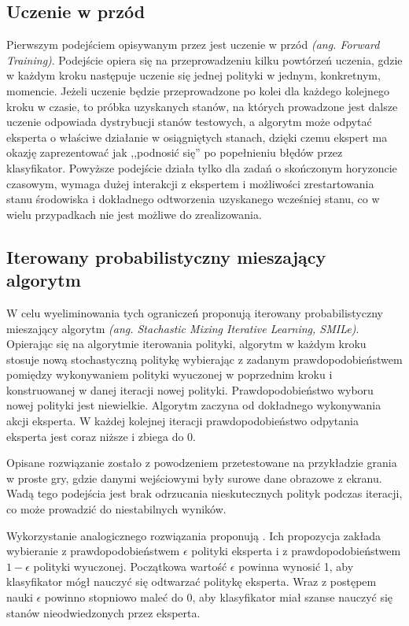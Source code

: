 \subsection{Uczenie w przód}
Pierwszym podejściem opisywanym przez \cite{bagnell2010efficient} jest uczenie w przód \textit{(ang. Forward Training)}. Podejście opiera się na przeprowadzeniu kilku powtórzeń uczenia, gdzie w każdym kroku następuje uczenie się jednej polityki w jednym, konkretnym, momencie. Jeżeli uczenie będzie przeprowadzone po kolei dla każdego kolejnego kroku w czasie, to próbka uzyskanych stanów, na których prowadzone jest dalsze uczenie odpowiada dystrybucji stanów testowych, a algorytm może odpytać eksperta o właściwe działanie w osiągniętych stanach, dzięki czemu ekspert ma okazję zaprezentować jak ,,podnosić się'' po popełnieniu błędów przez klasyfikator. Powyższe podejście działa tylko dla zadań o skończonym horyzoncie czasowym, wymaga dużej interakcji z ekspertem i możliwości zrestartowania stanu środowiska i dokładnego odtworzenia uzyskanego wcześniej stanu, co w wielu przypadkach nie jest możliwe do zrealizowania.

\subsection{Iterowany probabilistyczny mieszający algorytm}\label{smile}
W celu wyeliminowania tych ograniczeń \cite{DBLP:journals/corr/abs-1011-0686} proponują iterowany probabilistyczny mieszający algorytm \textit{(ang. Stachastic Mixing Iterative Learning, SMILe)}. Opierając się na algorytmie iterowania polityki, algorytm w każdym kroku stosuje nową stochastyczną politykę wybierając z zadanym prawdopodobieństwem pomiędzy wykonywaniem polityki wyuczonej w poprzednim kroku i konstruowanej w danej iteracji nowej polityki. Prawdopodobieństwo wyboru nowej polityki jest niewielkie. Algorytm zaczyna od dokładnego wykonywania akcji eksperta. W każdej kolejnej iteracji prawdopodobieństwo odpytania eksperta jest coraz niższe i zbiega do 0.

Opisane rozwiązanie zostało z powodzeniem przetestowane na przykładzie grania w proste gry, gdzie danymi wejściowymi były surowe dane obrazowe z ekranu. Wadą tego podejścia jest brak odrzucania nieskutecznych polityk podczas iteracji, co może prowadzić do niestabilnych wyników.

Wykorzystanie analogicznego rozwiązania proponują \cite{DBLP:journals/corr/BengioVJS15}. Ich propozycja zakłada wybieranie z prawdopodobieństwem $\epsilon$ polityki eksperta i z prawdopodobieństwem $1-\epsilon$ polityki wyuczonej. Początkowa wartość $\epsilon$ powinna wynosić 1, aby klasyfikator mógł nauczyć się  odtwarzać politykę eksperta. Wraz z postępem nauki $\epsilon$ powinno stopniowo maleć do 0, aby klasyfikator miał szanse nauczyć się stanów nieodwiedzonych przez eksperta.

